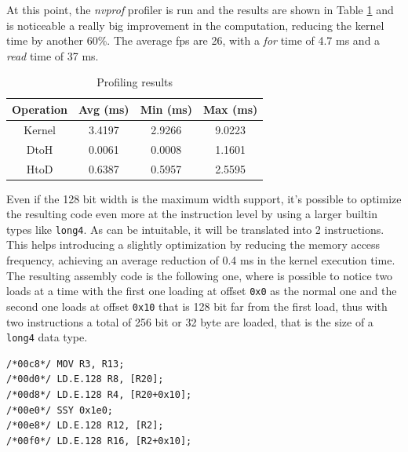 \documentclass[paper=a4, fontsize=10pt]{scrartcl}	%
\begin{document}

	At this point, the \textit{nvprof} profiler is run and the results are shown in Table \ref{tab:nvprof_naif6} and is noticeable a really big improvement in the computation, reducing the kernel time by another 60\%. The average fps are 26, with a \textit{for} time of 4.7 ms and a \textit{read} time of 37 ms. 

	\begin{table}[H]
		\centering
		\begin{tabular}{||c | c c c||} 
			\hline
			Operation & Avg (ms) & Min (ms) & Max (ms) \\ [0.5ex] 
			\hline\hline
			Kernel & 3.4197 & 2.9266 & 9.0223 \\ 
			\hdashline
			DtoH & 0.0061 & 0.0008 & 1.1601 \\
			\hdashline
			HtoD & 0.6387 & 0.5957 & 2.5595 \\
			\hline
		\end{tabular}
		\caption{Profiling results}
		\label{tab:nvprof_naif6}
	\end{table}

	Even if the 128 bit width is the maximum width support, it's possible to optimize the resulting code even more at the instruction level by using a larger builtin types like \texttt{long4}. As can be intuitable, it will be translated into 2 instructions. This helps introducing a slightly optimization by reducing the memory access frequency, achieving an average reduction of 0.4 ms in the kernel execution time.\\

	The resulting assembly code is the following one, where is possible to notice two loads at a time with the first one loading at offset \texttt{0x0} as the normal one and the second one loads at offset \texttt{0x10} that is 128 bit far from the first load, thus with two instructions a total of 256 bit or 32 byte are loaded, that is the size of a \texttt{long4} data type.
	
	\begin{lstlisting}[style=CStyle]
/*00c8*/ MOV R3, R13;
/*00d0*/ LD.E.128 R8, [R20];
/*00d8*/ LD.E.128 R4, [R20+0x10];
/*00e0*/ SSY 0x1e0;
/*00e8*/ LD.E.128 R12, [R2];
/*00f0*/ LD.E.128 R16, [R2+0x10]; \end{lstlisting}
	
\end{document}
